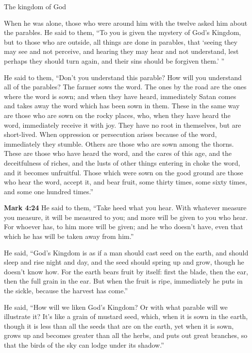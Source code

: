 \documentclass[10pt,twoside]{article} %
\newcommand{\quotesize}{\normalsize{}}
\newenvironment{quotetext}{\begingroup\quotesize}{\endgroup}
\newcommand{\intex}[1]{\index[texts]{#1}}
\newcommand{\bible}[2]{\begin{quotetext}\textbf{#1}\intex{#1} #2\end{quotetext}}
\newcommand{\gospelmark}[2]{\bible{Mark #1}{#2}}
\begin{document}
\begin{section}{The kingdom of God}
{  When he was alone, those who were around him with the twelve asked him about the parables.   He said to them, ``To you is given the mystery of God's Kingdom, but to those who are outside, all things are done in parables,    that `seeing they may see and not perceive, and hearing they may hear and not understand, lest perhaps they should turn again, and their sins should be forgiven them.' ''

  He said to them, ``Don't you understand this parable? How will you understand all of the parables?    The farmer sows the word.    The ones by the road are the ones where the word is sown; and when they have heard, immediately Satan comes and takes away the word which has been sown in them.    These in the same way are those who are sown on the rocky places, who, when they have heard the word, immediately receive it with joy.    They have no root in themselves, but are short-lived. When oppression or persecution arises because of the word, immediately they stumble.    Others are those who are sown among the thorns. These are those who have heard the word,    and the cares of this age, and the deceitfulness of riches, and the lusts of other things entering in choke the word, and it becomes unfruitful.    Those which were sown on the good ground are those who hear the word, accept it, and bear fruit, some thirty times, some sixty times, and some one hundred times.''}


\gospelmark{4:24}{
  He said to them, ``Take heed what you hear. With whatever measure you measure, it will be measured to you; and more will be given to you who hear.    For whoever has, to him more will be given; and he who doesn't have, even that which he has will be taken away from him.''

  He said, ``God's Kingdom is as if a man should cast seed on the earth,    and should sleep and rise night and day, and the seed should spring up and grow, though he doesn't know how.    For the earth bears fruit by itself: first the blade, then the ear, then the full grain in the ear.    But when the fruit is ripe, immediately he puts in the sickle, because the harvest has come.''

  He said, ``How will we liken God's Kingdom? Or with what parable will we illustrate it?    It's like a grain of mustard seed, which, when it is sown in the earth, though it is less than all the seeds that are on the earth,    yet when it is sown, grows up and becomes greater than all the herbs, and puts out great branches, so that the birds of the sky can lodge under its shadow.''

}
\end{section}
\end{document}
